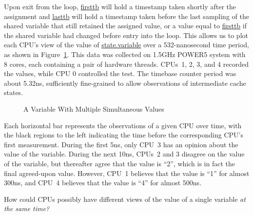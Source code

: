 Upon exit from the loop, \url{firsttb} will hold a timestamp
taken shortly after the assignment and \url{lasttb} will hold
a timestamp taken before the last sampling of the shared variable
that still retained the assigned value, or a value equal to \url{firsttb}
if the shared variable had changed before entry into the loop.
This allows us to plot each CPU's view of the value of \url{state.variable}
over a 532-nanosecond time period, as shown in
Figure~\ref{fig:advsync:A Variable With Multiple Simultaneous Values}.
This data was collected on 1.5GHz POWER5 system with 8 cores, each containing
a pair of hardware threads.
CPUs~1, 2, 3, and 4 recorded the values, while CPU 0 controlled the test.
The timebase counter period was about 5.32ns, sufficiently fine-grained
to allow observations of intermediate cache states.

\begin{figure}[htb]
\begin{center}
\end{center}
\caption{A Variable With Multiple Simultaneous Values}
\label{fig:advsync:A Variable With Multiple Simultaneous Values}
\end{figure}

Each horizontal bar represents the observations of a given CPU over time,
with the black regions to the left indicating the time before the
corresponding CPU's first measurement.
During the first 5ns, only CPU~3 has an opinion about the value of the
variable.
During the next 10ns, CPUs~2 and 3 disagree on the value of the variable,
but thereafter agree that the value is ``2'', which is in fact
the final agreed-upon value.
However, CPU~1 believes that the value is ``1'' for almost 300ns, and
CPU~4 believes that the value is ``4'' for almost 500ns.

\QuickQuiz{}
	How could CPUs possibly have different views of the
	value of a single variable \emph{at the same time?}
 \QuickQuizEnd

